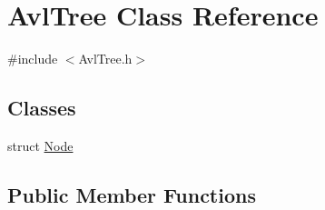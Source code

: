 \hypertarget{class_avl_tree}{}\section{Avl\+Tree Class Reference}
\label{class_avl_tree}


{\ttfamily \#include $<$Avl\+Tree.\+h$>$}

\subsection*{Classes}
\begin{DoxyCompactItemize}
\item 
struct \mbox{\hyperlink{struct_avl_tree_1_1_node}{Node}}
\end{DoxyCompactItemize}
\subsection*{Public Member Functions}
